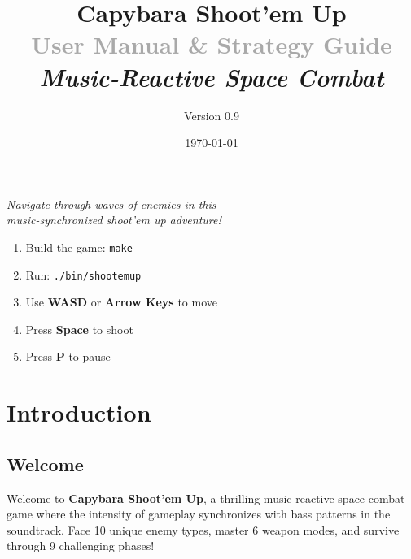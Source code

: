\documentclass[11pt,a4paper]{article}
\title{
    \Huge\textbf{\textcolor{primarycolor}{Capybara Shoot'em Up}}\\
    \vspace{0.5cm}
    \Large\textcolor{darkgray}{User Manual \& Strategy Guide}\\
    \vspace{0.3cm}
    \large\textit{Music-Reactive Space Combat}
}
\author{Version 0.9}
\date{\today}
\begin{document}
\maketitle
\thispagestyle{empty}

\begin{center}

\vspace{1cm}

\Large\textit{Navigate through waves of enemies in this\\
music-synchronized shoot'em up adventure!}
\end{center}

\vfill

\begin{tcolorbox}[colback=infocolor!10, colframe=infocolor, title=\textbf{Quick Start}]
\begin{enumerate}[leftmargin=*]
    \item Build the game: \texttt{make}
    \item Run: \texttt{./bin/shootemup}
    \item Use \textbf{WASD} or \textbf{Arrow Keys} to move
    \item Press \textbf{Space} to shoot
    \item Press \textbf{P} to pause
\end{enumerate}
\end{tcolorbox}

\newpage

\tableofcontents
\newpage

\section{Introduction}

\subsection{Welcome}

Welcome to \textbf{Capybara Shoot'em Up}, a thrilling music-reactive space combat game where the intensity of gameplay synchronizes with bass patterns in the soundtrack. Face 10 unique enemy types, master 6 weapon modes, and survive through 9 challenging phases!
\end{document}
